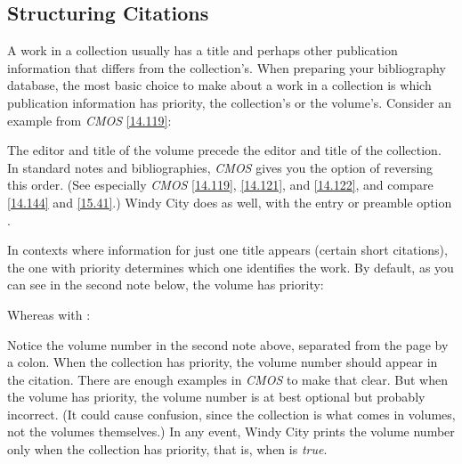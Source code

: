 \documentclass[11pt,letterpaper,oneside]{article}
\begin{document}
\subsection{Structuring Citations}
\label{collorder}

A work in a collection usually has a title and perhaps other
publication information that differs from the collection's. When
preparing your bibliography database, the most basic choice to make
about a work in a collection is which publication information has
priority, the collection's or the volume's. Consider an example from
\textit{CMOS} \ref{14.119}:

\begin{citebib}
\item \cite{armstrong2014}
\end{citebib}

\noindent The editor and title of the volume precede the editor and
title of the collection. In standard notes and bibliographies,
\textit{CMOS} gives you the option of reversing this order. (See
especially \textit{CMOS} \ref{14.119}, \ref{14.121}, and \ref{14.122},
and compare \ref{14.144} and \ref{15.41}.) Windy City does as well,
with the entry or preamble option .

\begin{citebib}
\item \cite{armstrong2014}
\end{citebib}

In contexts where information for just one title appears (certain
short citations), the one with priority determines which one
identifies the work. By default, as you can see in the second note
below, the volume has priority:

\begin{citeonly}
\item \cite{armstrong2014}
\item \cite[45]{armstrong2014}
\end{citeonly}

\noindent Whereas with :

\begin{citeonly}
\item \cite{armstrong2014}
\item \cite[45]{armstrong2014}
\end{citeonly}

Notice the volume number in the second note above, separated from the
page by a colon. When the collection has priority, the volume number
should appear in the citation. There are enough examples in
\textit{CMOS} to make that clear. But when the volume has priority,
the volume number is at best optional but probably incorrect. (It
could cause confusion, since the collection is what comes in volumes,
not the volumes themselves.) In any event, Windy City prints the
volume number only when the collection has priority, that is, when
 is \textit{true}.
\end{document}

